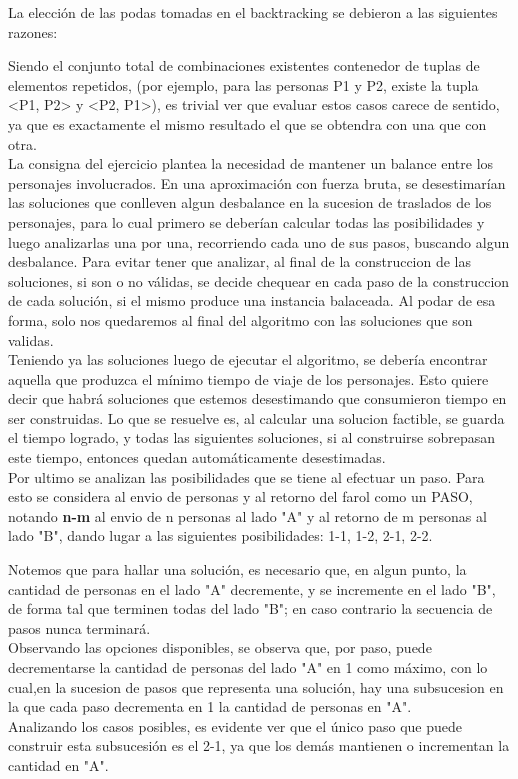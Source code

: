 La elección de las podas tomadas en el backtracking se debieron a las siguientes razones:

Siendo el conjunto total de combinaciones existentes contenedor de tuplas de elementos repetidos, (por ejemplo, para las personas P1 y P2, existe la tupla <P1, P2> y <P2, P1>), es trivial ver que evaluar estos casos carece de sentido, ya que es exactamente el mismo resultado el que se obtendra con una que con otra.\\

La consigna del ejercicio plantea la necesidad de mantener un balance entre los personajes involucrados. En una aproximación con fuerza bruta, se desestimarían las soluciones que conlleven algun desbalance en la sucesion de traslados de los personajes, para lo cual primero se deberían calcular todas las posibilidades y luego analizarlas una por una, recorriendo cada uno de sus pasos, buscando algun desbalance. Para evitar tener que analizar, al final de la construccion de las soluciones, si son o no válidas, se decide chequear en cada paso de la construccion de cada solución, si el mismo produce una instancia balaceada. Al podar de esa forma, solo nos quedaremos al final del algoritmo con las soluciones que son validas.\\

Teniendo ya las soluciones luego de ejecutar el algoritmo, se debería encontrar aquella que produzca el mínimo tiempo de viaje de los personajes. Esto quiere decir que habrá soluciones que estemos desestimando que consumieron tiempo en ser construidas. Lo que se resuelve es, al calcular una solucion factible, se guarda el tiempo logrado, y todas las siguientes soluciones, si al construirse sobrepasan este tiempo, entonces quedan automáticamente desestimadas.\\

Por ultimo se analizan las posibilidades que se tiene al efectuar un paso. Para esto se considera al envio de personas y al retorno del farol como un PASO, notando \textbf{n-m} al envio de n personas al lado "A" y al retorno de m personas al lado "B", dando lugar a las siguientes posibilidades: {1-1, 1-2, 2-1, 2-2}.

Notemos que para hallar una solución, es necesario que, en algun punto, la cantidad de personas en el lado "A" decremente, y se incremente en el lado "B", de forma tal que terminen todas del lado "B"; en caso contrario la secuencia de pasos nunca terminará.\\ Observando las opciones disponibles, se observa que, por paso, puede decrementarse la cantidad de personas del lado "A" en 1 como máximo, con lo cual,en la sucesion de pasos que representa una solución, hay una subsucesion en la que cada paso decrementa en 1 la cantidad de personas en "A".\\ Analizando los casos posibles, es evidente ver que el único paso que puede construir esta subsucesión es el 2-1, ya que los demás mantienen o incrementan la cantidad en "A".\\\\

